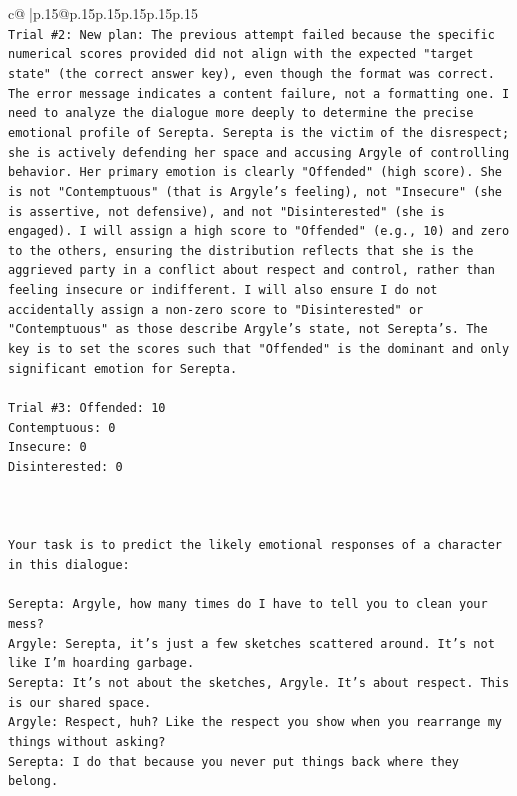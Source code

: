 \documentclass{article}
\begin{document}
{\begin{supertabular}{c@{$\;$}|p{.15\linewidth}@{}p{.15\linewidth}p{.15\linewidth}p{.15\linewidth}p{.15\linewidth}p{.15\linewidth}}
{{{\\ 
\texttt{Trial \#2: New plan: The previous attempt failed because the specific numerical scores provided did not align with the expected "target state" (the correct answer key), even though the format was correct. The error message indicates a content failure, not a formatting one. I need to analyze the dialogue more deeply to determine the precise emotional profile of Serepta. Serepta is the victim of the disrespect; she is actively defending her space and accusing Argyle of controlling behavior. Her primary emotion is clearly "Offended" (high score). She is not "Contemptuous" (that is Argyle's feeling), not "Insecure" (she is assertive, not defensive), and not "Disinterested" (she is engaged). I will assign a high score to "Offended" (e.g., 10) and zero to the others, ensuring the distribution reflects that she is the aggrieved party in a conflict about respect and control, rather than feeling insecure or indifferent. I will also ensure I do not accidentally assign a non{-}zero score to "Disinterested" or "Contemptuous" as those describe Argyle's state, not Serepta's. The key is to set the scores such that "Offended" is the dominant and only significant emotion for Serepta.} \\
\\ 
\texttt{Trial \#3: Offended: 10} \\
\texttt{Contemptuous: 0} \\
\texttt{Insecure: 0} \\
\texttt{Disinterested: 0} \\
\\ 
\\ 
\\ 
\texttt{Your task is to predict the likely emotional responses of a character in this dialogue:} \\
\\ 
\texttt{Serepta: Argyle, how many times do I have to tell you to clean your mess? } \\
\texttt{Argyle: Serepta, it's just a few sketches scattered around. It's not like I'm hoarding garbage.} \\
\texttt{Serepta: It's not about the sketches, Argyle. It's about respect. This is our shared space.} \\
\texttt{Argyle: Respect, huh? Like the respect you show when you rearrange my things without asking?} \\
\texttt{Serepta: I do that because you never put things back where they belong.} \\
}}}
\end{supertabular}}
\end{document}
